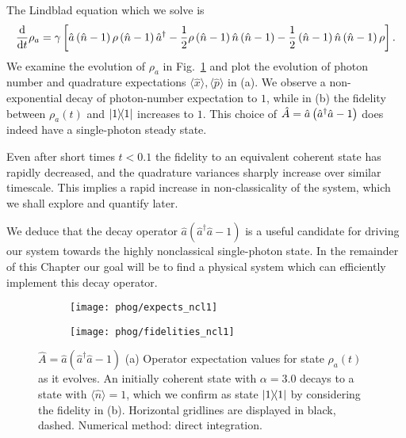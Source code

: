 The Lindblad equation which we solve is
\begin{equation}\label{eqn:phog_ncl_lindblad}
\frac{\mathrm{d}}{\mathrm{d}t} \rho_a = \gamma \left[ \hat{a}\left(\hat{n}-1\right) \rho \left(\hat{n}-1\right)\hat{a}^\dagger - \frac{1}{2} \rho \left(\hat{n}-1\right) \hat{n} \left(\hat{n}-1\right) - \frac{1}{2} \left(\hat{n}-1\right)\hat{n}\left(\hat{n}-1\right) \rho \right].
\end{equation}
We examine the evolution of $\rho_a$ in Fig.~\ref{fig:phog_A_ncl} and plot the evolution of photon number and quadrature expectations $\langle \hat{x}\rangle, \langle \hat{p}\rangle$ in (a). We observe a non-exponential decay of photon-number expectation to $1$,
while in (b) the fidelity between $\rho_a\left(t\right)$ and $\dyad{1}$ increases to $1$. This choice of $\hat{A} = \hat{a}\left(\hat{a}^\dagger \hat{a} - 1\right)$ does indeed have a single-photon steady state. 

Even after short times $t < 0.1$ the fidelity to an equivalent coherent state has rapidly decreased, and the quadrature variances sharply increase over similar timescale. This implies a rapid increase in non-classicality of the system, which we shall explore and quantify later.

We deduce that the decay operator $\hat{a}\left(\hat{a}^\dagger \hat{a} - 1\right)$ is a useful candidate for driving our system towards the highly nonclassical single-photon state. In the remainder of this Chapter our goal will be to find a physical system which can efficiently implement this decay operator.



\begin{figure}[htp]
\captionsetup{width=\linewidth}
\centering
	\begin{subfigure}{0.7\linewidth}
	\centering
	\caption{}
	\texttt{[image: phog/expects\_ncl1]}
	\end{subfigure}
	\begin{subfigure}{0.7\linewidth}
	\centering
	\caption{}
	\texttt{[image: phog/fidelities\_ncl1]}
	\end{subfigure}
\caption{\label{fig:phog_A_ncl}$\hat{A} = \hat{a}\left(\hat{a}^\dagger \hat{a} - 1\right)$ (a) Operator expectation values for state $\rho_a\left(t\right)$ as it evolves. An initially coherent state with $\alpha=3.0$ decays to a state with $\langle \hat{n}\rangle=1$, which we confirm as state $\dyad{1}$ by considering the fidelity in (b). Horizontal gridlines are displayed in black, dashed. Numerical method: direct integration.}
\end{figure}

